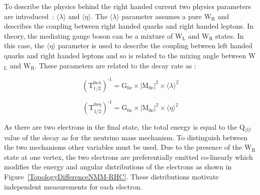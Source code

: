 \documentclass[main.tex]{subfiles}
\begin{document}
\bigskip


\NI To describe the physics behind the right handed current two physics parameters are introduced~: $\langle \lambda \rangle$ and $\langle \eta \rangle$. The $\langle \lambda \rangle$ parameter assumes a pure W$_\text{R}$ and describes the coupling between right handed quarks and right handed leptons. In theory, the mediating gauge boson can be a mixture of W$_\text{L}$ and W$_\text{R}$ states. In this case, the $\langle \eta \rangle$ parameter is used to describe the coupling between left handed quarks and right handed leptons and so is related to the mixing angle between W$_\text{L}$ and W$_\text{R}$. These parameters are related to the decay rate as :


\begin{equation}
(\text{T}_{\text{1/2}}^{\text{0}\nu\lambda})^{\text{-1}} = \text{G}_{\text{0}\nu} \times |\text{M}_{\text{0}\nu}|^\text{2} \times \langle \lambda \rangle^\text{2}
\end{equation}

\begin{equation}
(\text{T}_{\text{1/2}}^{\text{0}\nu\eta})^{\text{-1}} = \text{G}_{\text{0}\nu} \times |\text{M}_{\text{0}\nu}|^\text{2} \times \langle \eta \rangle^\text{2}
\end{equation}


\bigskip


\NI As there are two electrons in the final state, the total energy is equal to the Q$_{\beta\beta}$ value of the decay as for the neutrino mass mechanism. To distinguish between the two mechanisms other variables must be used. Due to the presence of the W$_\text{R}$ state at one vertex, the two electrons are preferentially emitted co-linearly which modifies the energy and angular distributions of the electrons as shown in Figure~\ref{TopologyDifferenceNMM-RHC}. These distributions motivate independent measurements for each electron.
\end{document}
